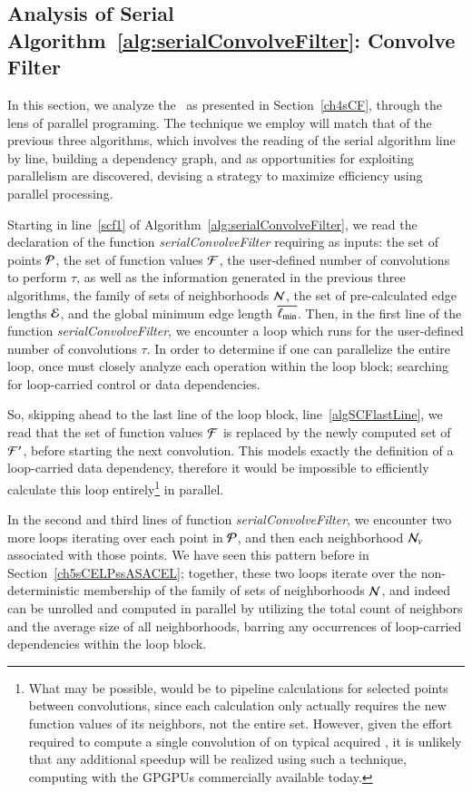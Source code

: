 %
%
\subsection{Analysis of Serial Algorithm~\ref{alg:serialConvolveFilter}: Convolve Filter}
\label{ch5sCFPssASACF}
In this section, we analyze the~ as presented in Section~\ref{ch4sCF}, through the lens of parallel programing. The technique we employ will match that of the previous three algorithms, which involves the reading of the serial algorithm line by line, building a dependency graph, and as opportunities for exploiting parallelism are discovered, devising a strategy to maximize efficiency using parallel processing.

Starting in line~\ref{scf1} of Algorithm~\ref{alg:serialConvolveFilter}, we read the declaration of the function \textit{serialConvolveFilter} requiring as inputs: the set of points $\mathcal{P}$, the set of function values $\mathcal{F}$, the user-defined number of convolutions to perform $\tau$, as well as the information generated in the previous three algorithms, the family of sets of neighborhoods $\mathcal{N}$, the set of pre-calculated edge lengths $\mathcal{E}$, and the global minimum edge length $\overline{\ell_\text{min}}$. Then, in the first line of the function \textit{serialConvolveFilter}, we encounter a loop which runs for the user-defined number of convolutions $\tau$. In order to determine if one can parallelize the entire loop, once must closely analyze each operation within the loop block; searching for loop-carried control or data dependencies.

So, skipping ahead to the last line of the loop block, line~\ref{algSCFlastLine}, we read that the set of function values $\mathcal{F}$ is replaced by the newly computed set of  $\mathcal{F}'$, before starting the next convolution. This models exactly the definition of a loop-carried data dependency, therefore it would be impossible to efficiently calculate this loop entirely\footnote{What may be possible, would be to pipeline calculations for selected points between convolutions, since each calculation only actually requires the new function values of its neighbors, not the entire set. However, given the effort required to compute a single convolution of  on typical acquired \tdd{}, it is unlikely that any additional speedup will be realized using such a technique, computing with the GPGPUs commercially available today.} in parallel.

In the second and third lines of function \textit{serialConvolveFilter}, we encounter two more loops iterating over each point in $\mathcal{P}$, and then each neighborhood $\mathcal{N}_v$ associated with those points. We have seen this pattern before in Section~\ref{ch5sCELPssASACEL}; together, these two loops iterate over the non-deterministic membership of the family of sets of neighborhoods $\mathcal{N}$, and indeed can be unrolled and computed in parallel by utilizing the total count of neighbors and the average size of all neighborhoods, barring any occurrences of loop-carried dependencies within the loop block.

